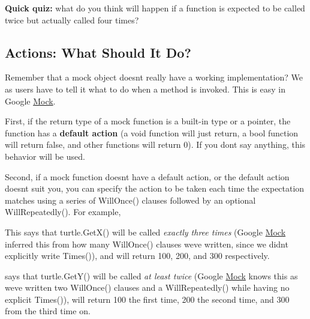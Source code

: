 {\bfseries{Quick quiz\+:}} what do you think will happen if a function is expected to be called twice but actually called four times?

\subsection*{Actions\+: What Should It Do?}

Remember that a mock object doesn\textquotesingle{}t really have a working implementation? We as users have to tell it what to do when a method is invoked. This is easy in Google \mbox{\hyperlink{class_mock}{Mock}}.

First, if the return type of a mock function is a built-\/in type or a pointer, the function has a {\bfseries{default action}} (a {\ttfamily void} function will just return, a {\ttfamily bool} function will return {\ttfamily false}, and other functions will return 0). If you don\textquotesingle{}t say anything, this behavior will be used.

Second, if a mock function doesn\textquotesingle{}t have a default action, or the default action doesn\textquotesingle{}t suit you, you can specify the action to be taken each time the expectation matches using a series of {\ttfamily Will\+Once()} clauses followed by an optional {\ttfamily Will\+Repeatedly()}. For example,


\begin{DoxyCode}{0}
\end{DoxyCode}


This says that {\ttfamily turtle.\+Get\+X()} will be called {\itshape exactly three times} (Google \mbox{\hyperlink{class_mock}{Mock}} inferred this from how many {\ttfamily Will\+Once()} clauses we\textquotesingle{}ve written, since we didn\textquotesingle{}t explicitly write {\ttfamily Times()}), and will return 100, 200, and 300 respectively.


\begin{DoxyCode}{0}
\end{DoxyCode}


says that {\ttfamily turtle.\+Get\+Y()} will be called {\itshape at least twice} (Google \mbox{\hyperlink{class_mock}{Mock}} knows this as we\textquotesingle{}ve written two {\ttfamily Will\+Once()} clauses and a {\ttfamily Will\+Repeatedly()} while having no explicit {\ttfamily Times()}), will return 100 the first time, 200 the second time, and 300 from the third time on.

